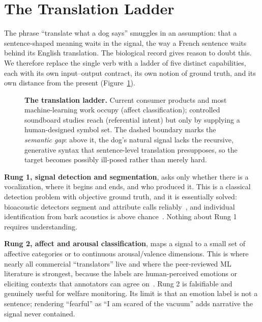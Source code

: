 \section{The Translation Ladder}
\label{sec:ladder}

The phrase ``translate what a dog says'' smuggles in an assumption: that a
sentence-shaped meaning waits in the signal, the way a French sentence waits
behind its English translation. The biological record gives reason to doubt
this. We therefore replace the single verb with a ladder of five distinct
capabilities, each with its own input--output contract, its own notion of
ground truth, and its own distance from the present
(Figure~\ref{fig:ladder}).

\begin{figure}[t]
\centering
\resizebox{\textwidth}{!}{}
\caption{\textbf{The translation ladder.} Current consumer products and most
machine-learning work occupy  (affect classification);
controlled soundboard studies reach  (referential intent) but
only by supplying a human-designed symbol set. The dashed boundary marks the
\emph{semantic gap}: above it, the dog's natural signal lacks the recursive,
generative syntax that sentence-level translation presupposes, so the target
becomes possibly ill-posed rather than merely hard.}
\label{fig:ladder}
\end{figure}

\textbf{Rung 1, signal detection and segmentation}, asks only whether there
is a vocalization, where it begins and ends, and who produced it. This is a
classical detection problem with objective ground truth, and it is
essentially solved: bioacoustic detectors segment and attribute calls
reliably~\cite{ghani2023perch,hagiwara2023aves}, and individual
identification from bark acoustics is above
chance~\cite{molnar2006discriminate}. Nothing about Rung 1 requires
understanding.

\textbf{Rung 2, affect and arousal classification}, maps a signal to a small
set of affective categories or to continuous arousal/valence dimensions.
This is where nearly all commercial ``translators'' live and where the
peer-reviewed ML literature is strongest, because the labels are
human-perceived emotions or eliciting contexts that annotators can agree
on~\cite{pongracz2006acoustic,icassp2018dogbark,sci2022explainable}. Rung 2
is falsifiable and genuinely useful for welfare monitoring. Its limit is
that an emotion label is not a sentence; rendering ``fearful'' as ``I am
scared of the vacuum'' adds narrative the signal never contained.

